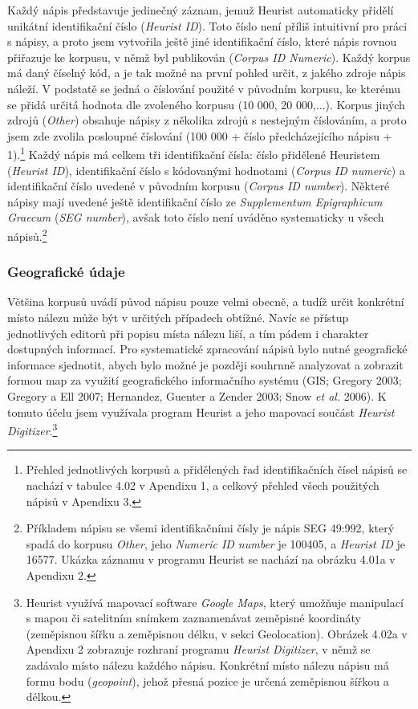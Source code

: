 Každý nápis představuje jedinečný záznam, jemuž Heurist automaticky přidělí unikátní identifikační číslo ({\em Heurist ID}). Toto číslo není příliš intuitivní pro práci s nápisy, a proto jsem vytvořila ještě jiné identifikační číslo, které nápis rovnou přiřazuje ke korpusu, v němž byl publikován ({\em Corpus ID Numeric}). Každý korpus má daný číselný kód, a je tak možné na první pohled určit, z jakého zdroje nápis náleží. V podstatě se jedná o číslování použité v původním korpusu, ke kterému se přidá určitá hodnota dle zvoleného korpusu (10 000, 20 000,...). Korpus jiných zdrojů ({\em Other}) obsahuje nápisy z několika zdrojů s nestejným číslováním, a proto jsem zde zvolila posloupné číslování (100 000 + číslo předcházejícího nápisu + 1).\footnote{Přehled jednotlivých korpusů a přidělených řad identifikačních čísel nápisů se nachází v tabulce 4.02 v Apendixu 1, a celkový přehled všech použitých nápisů v Apendixu 3.} Každý nápis má celkem tři identifikační čísla: číslo přidělené Heuristem ({\em Heurist ID}), identifikační číslo s kódovanými hodnotami ({\em Corpus ID numeric}) a identifikační číslo uvedené v původním korpusu ({\em Corpus ID number}). Některé nápisy mají uvedené ještě identifikační číslo ze {\em Supplementum Epigraphicum Graecum} ({\em SEG number}), avšak toto číslo není uváděno systematicky u všech nápisů.\footnote{Příkladem nápisu se všemi identifikačními čísly je nápis SEG 49:992, který spadá do korpusu {\em Other}, jeho {\em Numeric ID number} je 100405, a {\em Heurist ID} je 16577. Ukázka záznamu v programu Heurist se nachází na obrázku 4.01a v Apendixu 2.}

\subsubsection[geografické-údaje]{Geografické údaje}

Většina korpusů uvádí původ nápisu pouze velmi obecně, a tudíž určit konkrétní místo nálezu může být v určitých případech obtížné. Navíc se přístup jednotlivých editorů při popisu místa nálezu liší, a tím pádem i charakter dostupných informací. Pro systematické zpracování nápisů bylo nutné geografické informace sjednotit, abych bylo možné je později souhrnně analyzovat a zobrazit formou map za využití geografického informačního systému (GIS; Gregory 2003; Gregory a Ell 2007; Hernandez, Guenter a Zender 2003; Snow {\em et al.} 2006). K tomuto účelu jsem využívala program Heurist a jeho mapovací součást {\em Heurist Digitizer}.\footnote{Heurist využívá mapovací software {\em Google Maps}, který umožňuje manipulací s mapou či satelitním snímkem zaznamenávat zeměpisné koordináty (zeměpisnou šířku a zeměpisnou délku, v sekci Geolocation). Obrázek 4.02a v Apendixu 2 zobrazuje rozhraní programu {\em Heurist Digitizer}, v němž se zadávalo místo nálezu každého nápisu. Konkrétní místo nálezu nápisu má formu bodu ({\em geopoint}), jehož přesná pozice je určená zeměpisnou šířkou a délkou.}

